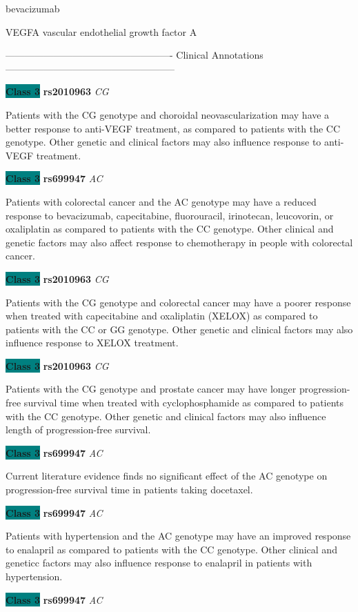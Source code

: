 \documentclass{resume} %
\begin{document}
\begin{rSection}{ bevacizumab }
\begin{rSubsection}{ VEGFA }{ vascular endothelial growth factor A }{}{}
\item[] ---------------------------------------------------- Clinical Annotations -----------------------------------------------------\newline
\item \textbf{\colorbox{teal} {Class 3}} \textbf{ rs2010963 } \textit{ CG }
\item[] Patients with the CG genotype and choroidal neovascularization may have a better response to anti-VEGF treatment, as compared to patients with the CC genotype. Other genetic and clinical factors may also influence response to anti-VEGF treatment. \item \textbf{\colorbox{teal} {Class 3}} \textbf{ rs699947 } \textit{ AC }
\item[] Patients with colorectal cancer and the AC genotype may have a reduced response to bevacizumab, capecitabine, fluorouracil, irinotecan, leucovorin, or oxaliplatin as compared to patients with the CC genotype. Other clinical and genetic factors may also affect response to chemotherapy in people with colorectal cancer.\item \textbf{\colorbox{teal} {Class 3}} \textbf{ rs2010963 } \textit{ CG }
\item[] Patients with the CG genotype and colorectal cancer may have a poorer response when treated with capecitabine and oxaliplatin (XELOX) as compared to patients with the CC or GG genotype. Other genetic and clinical factors may also influence response to XELOX treatment.\item \textbf{\colorbox{teal} {Class 3}} \textbf{ rs2010963 } \textit{ CG }
\item[] Patients with the CG genotype and prostate cancer may have longer progression-free survival time when treated with cyclophosphamide as compared to patients with the CC genotype. Other genetic and clinical factors may also influence length of progression-free survival.\item \textbf{\colorbox{teal} {Class 3}} \textbf{ rs699947 } \textit{ AC }
\item[] Current literature evidence finds no significant effect of the AC genotype on progression-free survival time in patients taking docetaxel.\item \textbf{\colorbox{teal} {Class 3}} \textbf{ rs699947 } \textit{ AC }
\item[] Patients with hypertension and the AC genotype may have an improved response to enalapril as compared to patients with the CC genotype. Other clinical and geneticc factors may also influence response to enalapril in patients with hypertension. \item \textbf{\colorbox{teal} {Class 3}} \textbf{ rs699947 } \textit{ AC }

\end{rSubsection}
\end{rSection}
\end{document}
